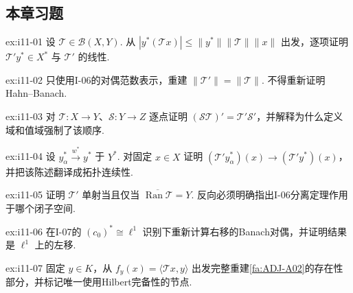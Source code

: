 \subsection{本章习题}\label{sec:i11-exercises}

\begin{FAExercise}[对偶算子的良定义]{ex:i11-01}
设 \(\displaystyle \mathcal T\in\mathcal B(X,Y)\). 从 \(\displaystyle |y^*(\mathcal T x)|\leqslant\|y^*\|\|\mathcal T\|\|x\|\) 出发，逐项证明 \(\displaystyle \mathcal T'y^*\in X^*\) 与 \(\displaystyle \mathcal T'\) 的线性.
\end{FAExercise}

\begin{FAExercise}[对偶算子范数等式]{ex:i11-02}
只使用I-06的对偶范数表示，重建 \(\displaystyle \|\mathcal T'\|=\|\mathcal T\|\). 不得重新证明Hahn--Banach.
\end{FAExercise}

\begin{FAExercise}[复合反序]{ex:i11-03}
对 \(\displaystyle \mathcal T:X\to Y\)、\(\displaystyle \mathcal S:Y\to Z\) 逐点证明 \(\displaystyle (\mathcal S\mathcal T)'=\mathcal T'\mathcal S'\)，并解释为什么定义域和值域强制了该顺序.
\end{FAExercise}

\begin{FAExercise}[弱*连续性]{ex:i11-04}
设 \(\displaystyle y_\alpha^*\overset{w^*}{\longrightarrow}y^*\) 于 \(\displaystyle Y^*\). 对固定 \(\displaystyle x\in X\) 证明 \(\displaystyle (\mathcal T'y_\alpha^*)(x)\to(\mathcal T'y^*)(x)\)，并把该陈述翻译成拓扑连续性.
\end{FAExercise}

\begin{FAExercise}[稠密值域与单射对偶]{ex:i11-05}
证明 \(\displaystyle \mathcal T'\) 单射当且仅当 \(\displaystyle \overline{\operatorname{Ran}\mathcal T}=Y\). 反向必须明确指出I-06分离定理作用于哪个闭子空间.
\end{FAExercise}

\begin{FAExercise}{ex:i11-06}
在I-07的 \(\displaystyle (c_0)^*\cong\ell^1\) 识别下重新计算右移的Banach对偶，并证明结果是 \(\displaystyle \ell^1\) 上的左移.
\end{FAExercise}

\begin{FAExercise}[伴随的Riesz构造]{ex:i11-07}
固定 \(\displaystyle y\in K\)，从 \(\displaystyle f_y(x)=\langle\mathcal T x,y\rangle\) 出发完整重建\autoref{fa:ADJ-A02}的存在性部分，并标记唯一使用Hilbert完备性的节点.
\end{FAExercise}

